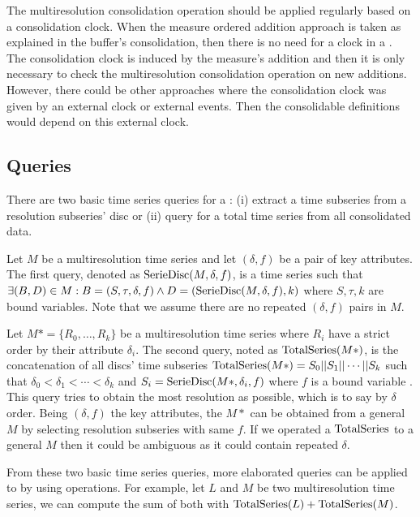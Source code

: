 The multiresolution consolidation operation should be applied
regularly based on a consolidation clock. When the measure ordered
addition approach is taken as explained in the buffer's consolidation,
then there is no need for a clock in a . The consolidation clock
is induced by the measure's addition and then it is only necessary to
check the multiresolution consolidation operation on new
additions. However, there could be other approaches where the
consolidation clock was given by an external clock or external
events. Then the consolidable definitions would depend on this
external clock.





\subsection{Queries}


There are two basic time series queries for a : (i) extract a
time subseries from a resolution subseries' disc or (ii) query for a
total time series from all consolidated data.

Let $M$ be a multiresolution time series and let $(\delta,f)$ be a
pair of key attributes.  The first query, denoted as
$\operatorname{SerieDisc}(M,\delta,f)$, is a time series such that $\exists (B,D)
\in M: B=(S,\tau,\delta,f) \wedge D=(\operatorname{SerieDisc}(M,\delta,f), k) $
where $S,\tau,k$ are bound variables.  Note that we
assume there are no repeated $(\delta,f)$ pairs in $M$.


Let $M*=\{R_0, \dots, R_k\}$ be a multiresolution time series where
$R_i$ have a strict order by their attribute $\delta_i$.  The second
query, noted as $\operatorname{TotalSeries}(M*)$, is the concatenation of all discs'
time subseries $\operatorname{TotalSeries}(M*) = S_{0} || S_{1} || \cdots || S_{k}$
such that $\delta_0 < \delta_1 < \cdots < \delta_k$ and
$S_i=\operatorname{SerieDisc}(M*,\delta_i,f)$ where $f$ is a bound variable . This
query tries to obtain the most resolution as possible, which is to say
by $\delta$ order.  Being $(\delta,f)$ the key attributes, the $M*$
can be obtained from a general $M$ by selecting resolution subseries
with same $f$. If we operated a $\operatorname{TotalSeries}$ to a general $M$ then
it could be ambiguous as it could contain repeated $\delta$.


From these two basic time series queries, more elaborated queries can
be applied to  by using  operations. For
example, let $L$ and $M$ be two multiresolution time series, we
can compute the sum of both with $\operatorname{TotalSeries}(L) +
\operatorname{TotalSeries}(M)$.





